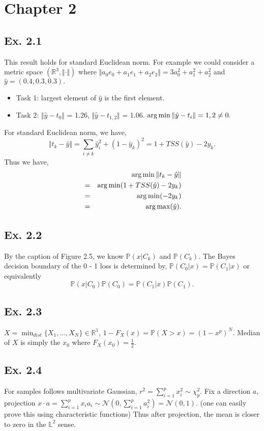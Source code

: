 \section*{Chapter 2}
\subsection*{Ex. 2.1}
This result holds for standard Euclidean norm. For example we could consider a metric space $(\mathbb{R}^3, \Vert\cdot\Vert)$ where
$\Vert a_0 e_0 + a_1 e_1 + a_2 e_2\Vert= 3 a_0^2 + a_1^2 + a_2^2$ and $\hat{y} = (0.4, 0.3, 0.3).$
\begin{itemize}
	\item Task 1: largest element of $\hat{y}$ is the first element.
	\item Task 2: $\Vert \hat{y} - t_0 \Vert $ = 1.26, $\Vert \hat{y} - t_{1, 2} \Vert $ = 1.06. $\operatorname*{arg\,min} \Vert \hat{y} - t_{i} \Vert = 1, 2 \neq 0.$
\end{itemize}
For standard Euclidean norm, we have,
$$\Vert t_k - \hat{y}\Vert =  \sum_{i\neq k}\hat{y}^2_i + (1 - \hat{y}_{k})^2 = 1 + TSS(\hat{y}) - 2y_{k}.$$
Thus we have,
\begin{eqnarray*}
	& & \operatorname*{arg\,min}\Vert t_k - \hat{y}\Vert \\
	&=& \operatorname*{arg\,min}(1 + TSS(\hat{y}) - 2y_{k}) \\
	&=& \operatorname*{arg\,min}(- 2y_{k}) \\
	&=& \operatorname*{arg\,max}(\hat{y}).
\end{eqnarray*}

\subsection*{Ex. 2.2}
By the caption of Figure 2.5, we know $\mathbb{P}(x | C_{k})$ and $\mathbb{P}(C_{k})$. The  Bayes decision boundary of the 0 - 1 loss is determined by, $\mathbb{P}(C_{0} | x) = \mathbb{P}(C_{1} | x)$ or equivalently
$$\mathbb{P}(x | C_{0})\mathbb{P}(C_{0}) = \mathbb{P}(C_{1} | x) \mathbb{P}(C_{1}).$$

\subsection*{Ex. 2.3}
$X = \min_{dist} \{X_1,...,X_N\} \in \mathbb{R}^1$, $1 - F_X(x) = \mathbb{P}(X > x) = (1 - x^p)^N.$ Median of $X$ is simply the $x_0$ where $F_X(x_0) = \frac{1}{2}.$

\subsection*{Ex. 2.4}
For samples follows multivariate Gaussian, $r^2 = \sum_{i=1}^{p} x_i^2 \sim \chi^2_{p}.$ Fix a direction $a$, projection $x \cdot a = \sum_{i=1}^{p} x_i a_i \sim \mathcal{N}(0, \sum_{i=1}^{p}a_{i}^2) = \mathcal{N}(0, 1).$ (one can easily prove this using characteristic functions) Thus after projection, the mean is closer to zero in the $\mathbb{L}^2$ sense.

